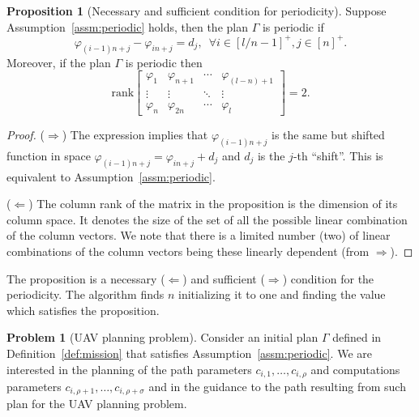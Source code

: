 \documentclass[letterpaper,10pt,conference]{ieeeconf}
\theoremstyle{definition}
\newtheorem{prop}[thm]{Proposition}
\newtheorem{pb}{Problem}[section]
\begin{document}
\begin{prop}[Necessary and sufficient condition for periodicity]\label{prop:rank}
  Suppose Assumption~\ref{assm:periodic} holds, then the plan $\Gamma$ is periodic if
  \begin{equation*}
    \varphi_{(i-1)n+j}-\varphi_{in+j}=d_j,\,\,\,\forall i\in[l/n-1]^+,j\in[n]^+.
  \end{equation*}
  Moreover, if the plan $\Gamma$ is periodic then
  \begin{equation*}
    \mathrm{rank}\begin{bmatrix}
        \varphi_1 & \varphi_{n+1} & \cdots & \varphi_{(l-n)+1} \\ 
        \vdots & \vdots & \ddots & \vdots \\
        \varphi_n & \varphi_{2n} & \cdots & \varphi_l   
      \end{bmatrix}=2.
  \end{equation*}
\end{prop}
\begin{proof}($\Longrightarrow$) The expression implies that $\varphi_{(i-1)n+j}$ is the same but shifted function in space $\varphi_{(i-1)n+j}=\varphi_{in+j}+d_j$ and $d_j$ is the $j$-th ``shift''. This is equivalent to Assumption~\ref{assm:periodic}.
  
($\Longleftarrow$) The column rank of the matrix in the proposition is the dimension of its column space. It denotes the size of the set of all the possible linear combination of the column vectors. We note that there is a limited number (two) of linear combinations of the column vectors being these linearly dependent (from $\Longrightarrow$). 
\end{proof}

The proposition is a necessary ($\Longleftarrow$) and sufficient ($\Longrightarrow$) condition for the periodicity. The algorithm finds $n$ initializing it to one and finding the value which satisfies the proposition. 

\begin{pb}[UAV planning problem]\label{pb}
  Consider an initial plan $\Gamma$ defined in Definition~\ref{def:mission} that satisfies Assumption~\ref{assm:periodic}. We are interested in the planning of the path parameters $c_{i,1},\dots,c_{i,\rho}$ and computations parameters $c_{i,\rho+1},\dots,c_{i,\rho+\sigma}$ and in the guidance to the path resulting from such plan for the UAV planning problem.
\end{pb}
\end{document}
